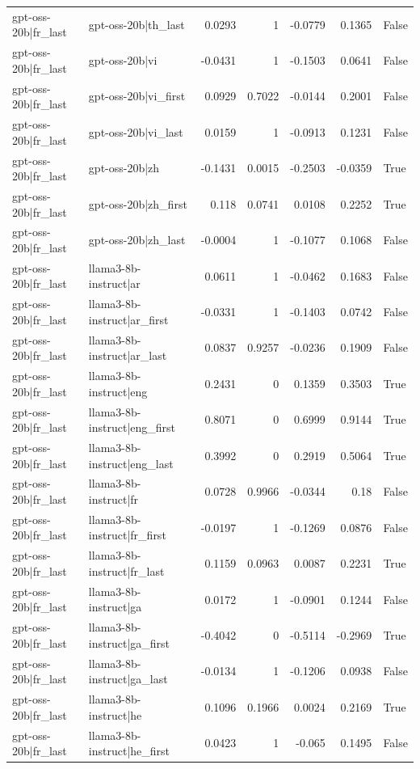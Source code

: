 \begin{table}
\begin{tabular}{l l r r r r l}
gpt-oss-20b|fr_last & gpt-oss-20b|th_last & 0.0293 & 1 & -0.0779 & 0.1365 & False \\
gpt-oss-20b|fr_last & gpt-oss-20b|vi & -0.0431 & 1 & -0.1503 & 0.0641 & False \\
gpt-oss-20b|fr_last & gpt-oss-20b|vi_first & 0.0929 & 0.7022 & -0.0144 & 0.2001 & False \\
gpt-oss-20b|fr_last & gpt-oss-20b|vi_last & 0.0159 & 1 & -0.0913 & 0.1231 & False \\
gpt-oss-20b|fr_last & gpt-oss-20b|zh & -0.1431 & 0.0015 & -0.2503 & -0.0359 & True \\
gpt-oss-20b|fr_last & gpt-oss-20b|zh_first & 0.118 & 0.0741 & 0.0108 & 0.2252 & True \\
gpt-oss-20b|fr_last & gpt-oss-20b|zh_last & -0.0004 & 1 & -0.1077 & 0.1068 & False \\
gpt-oss-20b|fr_last & llama3-8b-instruct|ar & 0.0611 & 1 & -0.0462 & 0.1683 & False \\
gpt-oss-20b|fr_last & llama3-8b-instruct|ar_first & -0.0331 & 1 & -0.1403 & 0.0742 & False \\
gpt-oss-20b|fr_last & llama3-8b-instruct|ar_last & 0.0837 & 0.9257 & -0.0236 & 0.1909 & False \\
gpt-oss-20b|fr_last & llama3-8b-instruct|eng & 0.2431 & 0 & 0.1359 & 0.3503 & True \\
gpt-oss-20b|fr_last & llama3-8b-instruct|eng_first & 0.8071 & 0 & 0.6999 & 0.9144 & True \\
gpt-oss-20b|fr_last & llama3-8b-instruct|eng_last & 0.3992 & 0 & 0.2919 & 0.5064 & True \\
gpt-oss-20b|fr_last & llama3-8b-instruct|fr & 0.0728 & 0.9966 & -0.0344 & 0.18 & False \\
gpt-oss-20b|fr_last & llama3-8b-instruct|fr_first & -0.0197 & 1 & -0.1269 & 0.0876 & False \\
gpt-oss-20b|fr_last & llama3-8b-instruct|fr_last & 0.1159 & 0.0963 & 0.0087 & 0.2231 & True \\
gpt-oss-20b|fr_last & llama3-8b-instruct|ga & 0.0172 & 1 & -0.0901 & 0.1244 & False \\
gpt-oss-20b|fr_last & llama3-8b-instruct|ga_first & -0.4042 & 0 & -0.5114 & -0.2969 & True \\
gpt-oss-20b|fr_last & llama3-8b-instruct|ga_last & -0.0134 & 1 & -0.1206 & 0.0938 & False \\
gpt-oss-20b|fr_last & llama3-8b-instruct|he & 0.1096 & 0.1966 & 0.0024 & 0.2169 & True \\
gpt-oss-20b|fr_last & llama3-8b-instruct|he_first & 0.0423 & 1 & -0.065 & 0.1495 & False \\

\end{tabular}
\end{table}
